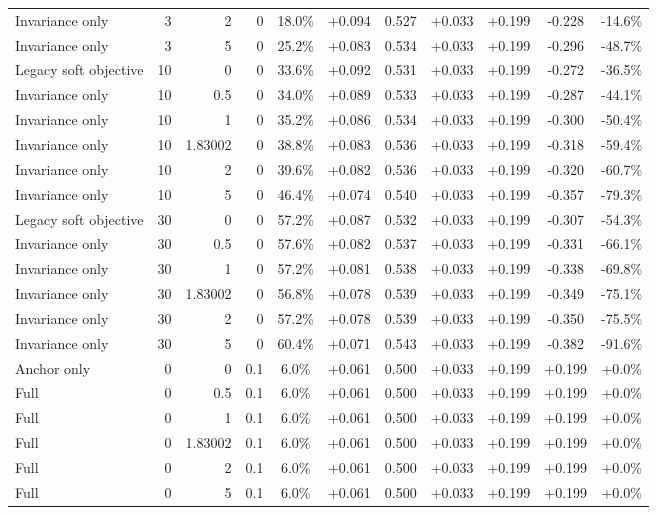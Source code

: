 \begin{table}[htbp]
\begin{tabular}{lrrrccccccc}
Invariance only & 3 & 2 & 0 & 18.0\% & +0.094 & 0.527 & +0.033 & +0.199 & -0.228 & -14.6\% \\
Invariance only & 3 & 5 & 0 & 25.2\% & +0.083 & 0.534 & +0.033 & +0.199 & -0.296 & -48.7\% \\
Legacy soft objective & 10 & 0 & 0 & 33.6\% & +0.092 & 0.531 & +0.033 & +0.199 & -0.272 & -36.5\% \\
Invariance only & 10 & 0.5 & 0 & 34.0\% & +0.089 & 0.533 & +0.033 & +0.199 & -0.287 & -44.1\% \\
Invariance only & 10 & 1 & 0 & 35.2\% & +0.086 & 0.534 & +0.033 & +0.199 & -0.300 & -50.4\% \\
Invariance only & 10 & 1.83002 & 0 & 38.8\% & +0.083 & 0.536 & +0.033 & +0.199 & -0.318 & -59.4\% \\
Invariance only & 10 & 2 & 0 & 39.6\% & +0.082 & 0.536 & +0.033 & +0.199 & -0.320 & -60.7\% \\
Invariance only & 10 & 5 & 0 & 46.4\% & +0.074 & 0.540 & +0.033 & +0.199 & -0.357 & -79.3\% \\
Legacy soft objective & 30 & 0 & 0 & 57.2\% & +0.087 & 0.532 & +0.033 & +0.199 & -0.307 & -54.3\% \\
Invariance only & 30 & 0.5 & 0 & 57.6\% & +0.082 & 0.537 & +0.033 & +0.199 & -0.331 & -66.1\% \\
Invariance only & 30 & 1 & 0 & 57.2\% & +0.081 & 0.538 & +0.033 & +0.199 & -0.338 & -69.8\% \\
Invariance only & 30 & 1.83002 & 0 & 56.8\% & +0.078 & 0.539 & +0.033 & +0.199 & -0.349 & -75.1\% \\
Invariance only & 30 & 2 & 0 & 57.2\% & +0.078 & 0.539 & +0.033 & +0.199 & -0.350 & -75.5\% \\
Invariance only & 30 & 5 & 0 & 60.4\% & +0.071 & 0.543 & +0.033 & +0.199 & -0.382 & -91.6\% \\
Anchor only & 0 & 0 & 0.1 & 6.0\% & +0.061 & 0.500 & +0.033 & +0.199 & +0.199 & +0.0\% \\
Full & 0 & 0.5 & 0.1 & 6.0\% & +0.061 & 0.500 & +0.033 & +0.199 & +0.199 & +0.0\% \\
Full & 0 & 1 & 0.1 & 6.0\% & +0.061 & 0.500 & +0.033 & +0.199 & +0.199 & +0.0\% \\
Full & 0 & 1.83002 & 0.1 & 6.0\% & +0.061 & 0.500 & +0.033 & +0.199 & +0.199 & +0.0\% \\
Full & 0 & 2 & 0.1 & 6.0\% & +0.061 & 0.500 & +0.033 & +0.199 & +0.199 & +0.0\% \\
Full & 0 & 5 & 0.1 & 6.0\% & +0.061 & 0.500 & +0.033 & +0.199 & +0.199 & +0.0\% \\

\end{tabular}
\end{table}
